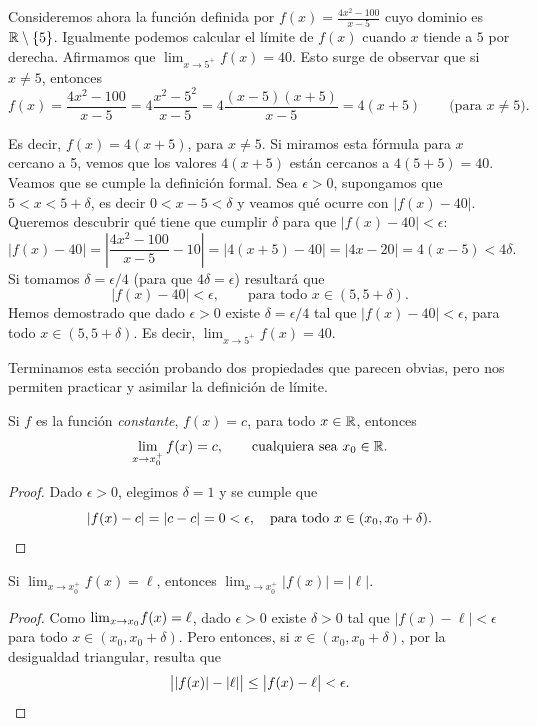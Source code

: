 \begin{example}
    Consideremos ahora la función definida por $f(x)=\frac{4x^2-100}{x-5}$ cuyo dominio es $\mathbb{R}\setminus\{5\}$.
    Igualmente podemos calcular el límite de $f(x)$ cuando $x$ tiende a $5$ por derecha.
    Afirmamos que $\lim_{x\to 5^+} f(x) = 40$. Esto surge de observar que si $x\neq 5$, entonces
    \[
    f(x) = \frac{4x^2-100}{x-5} = 4\frac{x^2-5^2}{x-5} = 4\frac{(x-5)(x+5)}{x-5} = 4(x+5)\qquad\text{(para $x\neq 5$).}
    \]
    
    Es decir, $f(x)=4(x+5)$, para $x\neq 5$. Si miramos esta fórmula para $x$ cercano a 5, vemos que los valores $4(x+5)$ están cercanos a $4(5+5)=40$.
    Veamos que se cumple la definición formal.
    Sea $\epsilon > 0$, supongamos que $5<x<5+\delta$, es decir $0<x-5<\delta$ y veamos qué ocurre con $|f(x)-40|$. Queremos descubrir qué tiene que cumplir $\delta$ para que $|f(x)-40|<\epsilon$:
    \[
    |f(x)-40|=\left|\frac{4x^2-100}{x-5}-10\right|=|4(x+5)-40|=|4x-20|=4(x-5)<4\delta.
    \]
    Si tomamos $\delta=\epsilon/4$ (para que $4\delta=\epsilon$) resultará que
    \[
    |f(x)-40| < \epsilon, \qquad\text{para todo $x \in (5,5+\delta)$}.
    \]
    Hemos demostrado que dado $\epsilon > 0$ existe $\delta=\epsilon/4$ tal que $|f(x)-40| < \epsilon$, para todo $x \in (5,5+\delta)$.
    Es decir, $\lim_{x\to 5^+} f(x) = 40$.
\end{example}

Terminamos esta sección probando dos propiedades que parecen obvias, pero nos permiten practicar y asimilar la definición de límite.

\begin{lemma}
    Si $f$ es la función \emph{constante}, $f(x)=c$, para todo $x\in\mathbb{R}$, entonces 
    \[ 
    \lim_{x\to x_0^+} f(x) = c, \qquad\text{cualquiera sea $x_0\in\mathbb{R}$}.
    \]
\end{lemma}

\begin{proof}
    Dado $\epsilon>0$, elegimos $\delta=1$ y se cumple que
    \[
    |f(x)-c|=|c-c|=0<\epsilon, \quad\text{para todo $x\in(x_0,x_0+\delta)$}.
    \qedhere \]
\end{proof}

\begin{proposition}
    Si $\lim_{x\to x_0^+} f(x) = \ell$, entonces $\lim_{x\to x_0^+} |f(x)|=|\ell|$.
\end{proposition}

\begin{proof}
    Como ${\lim_{x\to x_0}} f(x)=\ell$, dado $\epsilon>0$ existe $\delta>0$ tal que $| f(x)-\ell |<\epsilon$ para todo $x\in(x_0,x_0+\delta)$.
    Pero entonces, si $x\in(x_0,x_0+\delta)$, por la desigualdad triangular, resulta que
    \[
    \big| |f(x)|-|\ell| \big| \le \big| f(x)-\ell \big|<\epsilon.
    \qedhere
    \]
\end{proof}


